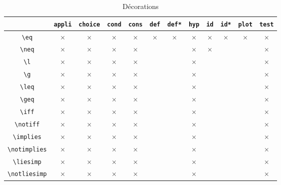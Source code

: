 \documentclass[12pt,a4paper]{article}
\theoremstyle{definition}
\begin{document}
\begin{table}[h]
    \caption{Décorations}
    \begin{center}
        \begin{tabular}{c|c|c|c|c|c|c|c|c|c|c|c}
              & \verb+appli+ & \verb+choice+ & \verb+cond+ & \verb+cons+ & \verb+def+ & \verb+def*+ & \verb+hyp+ & \verb+id+ & \verb+id*+ & \verb+plot+ & \verb+test+ \\
            \hline \verb+\eq+ & $\times$ & $\times$ & $\times$ & $\times$ & $\times$ & $\times$ & $\times$ & $\times$ & $\times$ & $\times$ & $\times$ \\
            \hline \verb+\neq+ & $\times$ & $\times$ & $\times$ & $\times$ &          &          & $\times$ & $\times$ &          &          & $\times$ \\
            \hline \verb+\l+ & $\times$ & $\times$ & $\times$ & $\times$ &          &          & $\times$ &          &          &          & $\times$ \\
            \hline \verb+\g+ & $\times$ & $\times$ & $\times$ & $\times$ &          &          & $\times$ &          &          &          & $\times$ \\
            \hline \verb+\leq+ & $\times$ & $\times$ & $\times$ & $\times$ &          &          & $\times$ &          &          &          & $\times$ \\
            \hline \verb+\geq+ & $\times$ & $\times$ & $\times$ & $\times$ &          &          & $\times$ &          &          &          & $\times$ \\
            \hline \verb+\iff+ & $\times$ & $\times$ & $\times$ & $\times$ &          &          & $\times$ &          &          &          & $\times$ \\
            \hline \verb+\notiff+ & $\times$ & $\times$ & $\times$ & $\times$ &          &          & $\times$ &          &          &          & $\times$ \\
            \hline \verb+\implies+ & $\times$ & $\times$ & $\times$ & $\times$ &          &          & $\times$ &          &          &          & $\times$ \\
            \hline \verb+\notimplies+ & $\times$ & $\times$ & $\times$ & $\times$ &          &          & $\times$ &          &          &          & $\times$ \\
            \hline \verb+\liesimp+ & $\times$ & $\times$ & $\times$ & $\times$ &          &          & $\times$ &          &          &          & $\times$ \\
            \hline \verb+\notliesimp+ & $\times$ & $\times$ & $\times$ & $\times$ &          &          & $\times$ &          &          &          & $\times$ \\
        \end{tabular}
    \end{center}
    \label{table:decorations-operators}
\end{table}
\end{document}
